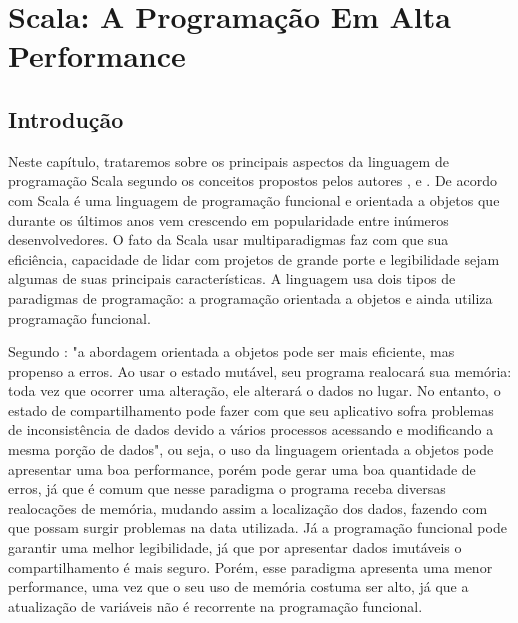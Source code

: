

	
	\chapter{Scala: A Programação Em Alta Performance }
	
	\section{Introdução}
	Neste capítulo, trataremos sobre os principais aspectos da linguagem de programação Scala segundo os conceitos propostos pelos autores \cite{Odersky}, \cite{Sfregola2021} e \cite{Wampler2021}. De acordo com \cite{Sfregola2021} Scala é uma linguagem de programação funcional e orientada a objetos que durante os últimos anos vem crescendo em popularidade entre inúmeros desenvolvedores. O fato da Scala usar  multiparadigmas faz com que sua eficiência, capacidade de lidar com projetos de grande porte e legibilidade sejam algumas de suas principais características. A linguagem usa dois tipos de paradigmas de programação: a programação orientada a objetos e ainda utiliza programação funcional. 
	
	Segundo \cite{Sfregola2021}: "a abordagem orientada a objetos pode
	ser mais eficiente, mas propenso a erros. Ao usar o estado mutável, seu programa realocará sua memória: toda vez que ocorrer uma alteração, ele alterará o
	dados no lugar. No entanto, o estado de compartilhamento pode fazer com que seu aplicativo sofra problemas de inconsistência de dados devido a vários processos acessando e modificando a mesma porção de dados", ou seja, o uso da linguagem orientada a objetos pode apresentar uma boa performance, porém pode gerar uma boa quantidade de erros, já que é comum que nesse paradigma o programa receba diversas realocações de memória, mudando assim a localização dos dados, fazendo com que possam surgir problemas na data utilizada. Já a programação funcional pode garantir uma melhor legibilidade, já que por apresentar dados imutáveis o compartilhamento é mais seguro. Porém, esse paradigma apresenta uma menor performance, uma vez que o seu uso de memória costuma ser alto, já que a atualização de variáveis não é recorrente na programação funcional.
	
